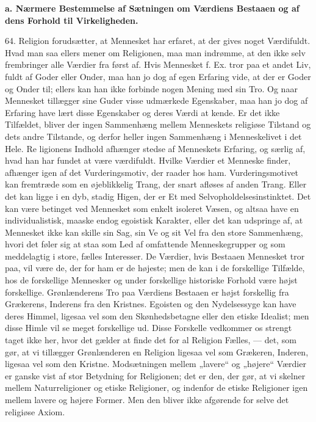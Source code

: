 \documentclass[12pt,a4paper,openany]{book}
\newcommand{\opage}[1]{\marginnote{\footnotesize\textit{[#1]}}}
\begin{document}
\begin{center}\textbf{a. Nærmere Bestemmelse af Sætningen om Værdiens Bestaaen og af dens Forhold til Virkeligheden.}\end{center}

64. Religion forudsætter, at Mennesket har erfaret, at der gives noget
Værdifuldt. Hvad man saa ellers mener om Religionen, maa man indrømme,
at den ikke selv frembringer alle Værdier fra først af. Hvis Mennesket
f. Ex. tror paa et andet Liv, fuldt af Goder eller Onder, maa han jo dog
af egen Erfaring vide, at der er Goder og Onder til; ellers kan han ikke
forbinde nogen Mening med sin Tro. Og naar Mennesket tillægger sine
Guder visse udmærkede Egenskaber, maa han jo dog af Erfaring have lært
disse Egenskaber og deres Værdi at kende. Er det ikke Tilfældet, bliver
der ingen Sammenhæng mellem Menneskets religiøse Tilstand og dets andre
Tilstande, og derfor heller ingen Sammenhæng i Menneskelivet i det Hele.
Re%
\opage{147}ligionens Indhold afhænger stedse af Menneskets Erfaring, og
særlig af, hvad han har fundet at være værdifuldt. Hvilke Værdier et
Menneske finder, afhænger igen af det Vurderingsmotiv, der raader hos
ham. Vurderingsmotivet kan fremtræde som en øjeblikkelig Trang, der
snart afløses af anden Trang. Eller det kan ligge i en dyb, stadig
Higen, der er Et med Selvopholdelsesinstinktet. Det kan være betinget
ved Mennesket som enkelt isoleret Væsen, og altsaa have en
individualistisk, maaske endog egoistisk Karakter, eller det kan
udspringe af, at Mennesket ikke kan skille sin Sag, sin Ve og sit Vel
fra den store Sammenhæng, hvori det føler sig at staa som Led af
omfattende Menneskegrupper og som meddelagtig i store, fælles
Interesser. De Værdier, hvis Bestaaen Mennesket tror paa, vil være de,
der for ham er de højeste; men de kan i de forskellige Tilfælde, hos de
forskellige Mennesker og under forskellige historiske Forhold være højst
forskellige. Grønlænderens Tro paa Værdiens Bestaaen er højst forskellig
fra Grækerens, Inderens fra den Kristnes. Egoisten og den Nydelsessyge
kan have deres Himmel, ligesaa vel som den Skønhedsbetagne eller den
etiske Idealist; men disse Himle vil se meget forskellige ud. Disse
Forskelle vedkommer os strengt taget ikke her, hvor det gælder at finde
det for al Religion Fælles, --- det, som gør, at vi tillægger
Grønlænderen en Religion ligesaa vel som Grækeren, Inderen, ligesaa vel
som den Kristne. Modsætningen mellem „lavere“ og „højere“ Værdier er
ganske vist af stor Betydning for Religionen; det er den, der gør, at vi
skelner mellem Naturreligioner og etiske Religioner, og indenfor de
etiske Religioner igen mellem lavere og højere Former. Men den bliver
ikke afgørende for selve det religiøse Axiom.
\end{document}
